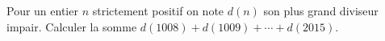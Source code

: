 \documentclass[varwidth]{standalone}
\begin{document}
    Pour un entier $n$ strictement positif on note $d(n)$ son plus grand diviseur impair. Calculer la somme $d(1008) + d(1009) + \dotsb + d(2015)$.
\end{document}
